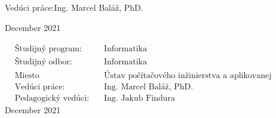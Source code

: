 \documentclass[12pt, a4paper, twoside, openright, slovak]{book}
\newcommand{\emptypage}{\newpage\thispagestyle{empty}\mbox{}\newpage}
\newcommand{\Supervisor}[0] {Ing. Marcel Baláž, PhD.}
\newcommand{\PedagogicalSupervisor}[0] {Ing. Jakub Findura}
\newcommand{\Date}[0] {December 2021}
\newcommand{\StudyProgramme}[0] {Informatika}
\newcommand{\StudyField}[0] {Informatika}
\newcommand{\Institute}[0] {Ústav počítačového inžinierstva a aplikovanej informatiky}
\begin{document}

\begin{flushleft}
Vedúci práce:\quad \Supervisor{\Large \par}
\vspace{\medskipamount}
\Date
\end{flushleft}
\emptypage 


\begin{flushleft}
{\setlength{\mathindent}{0.1cm}
\begin{align*}
& \text{Študijný program:} && \text{\StudyProgramme} \\
& \text{Študijný odbor:} && \text{\StudyField} \\
& \text{Miesto vypracovania:} && \text{\Institute} \\
& \text{Vedúci práce:} && \text{\Supervisor} \\
& \text{Pedagogický vedúci:} && \text{\PedagogicalSupervisor}
\end{align*}}
\vspace{2\bigskipamount}
\Date
\end{flushleft}
\emptypage

\newpage
\thispagestyle{empty}

\newpage

\emptypage
{}

%

%

\renewcommand{\contentsname}{Obsah}
\pagestyle{empty}
\tableofcontents{}
\listoffigures
\listofmyequations
\emptypage
\pagestyle{fancy}










\printbibliography[title={Literatúra}]


\end{document}
